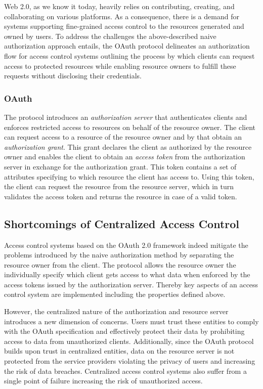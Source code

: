 \documentclass[conference]{IEEEtran}
\begin{document}
Web 2.0, as we know it today, heavily relies on contributing, creating, and collaborating on various platforms. \cite{community_web_2019}
As a consequence, there is a demand for systems supporting fine-grained access control to the resources generated and owned by users. 
To address the challenges the above-described naive authorization approach entails, the OAuth protocol delineates an authorization flow for access control systems outlining the process by which clients can request access to protected resources while enabling resource owners to fulfill these requests without disclosing their credentials.

\subsubsection*{OAuth}
The protocol introduces an \textit{authorization server} that authenticates clients and enforces restricted access to resources on behalf of the resource owner.
The client can request access to a resource of the resource owner and by that obtain an \textit{authorization grant}.
This grant declares the client as authorized by the resource owner and enables the client to obtain an \textit{access token} from the authorization server in exchange for the authorization grant.
This token contains a set of attributes specifying to which resource the client has access to.
Using this token, the client can request the resource from the resource server, which in turn validates the access token and returns the resource in case of a valid token. \cite{hardt_oauth_2012}

\subsection{Shortcomings of Centralized Access Control}
Access control systems based on the OAuth 2.0 framework indeed mitigate the problems introduced by the naive authorization method by separating the resource owner from the client.
The protocol allows the resource owner the individually specify which client gets access to what data when enforced by the access tokens issued by the authorization server. \cite{hardt_oauth_2012}
Thereby key aspects of an access control system are implemented including the properties defined above.

However, the centralized nature of the authorization and resource server introduces a new dimension of concerns.
Users must trust these entities to comply with the OAuth specification and effectively protect their data by prohibiting access to data from unauthorized clients.
Additionally, since the OAuth protocol builds upon trust in centralized entities, data on the resource server is not protected from the service providers violating the privacy of users and increasing the risk of data breaches.
Centralized access control systems also suffer from a single point of failure increasing the risk of unauthorized access.
\end{document}
